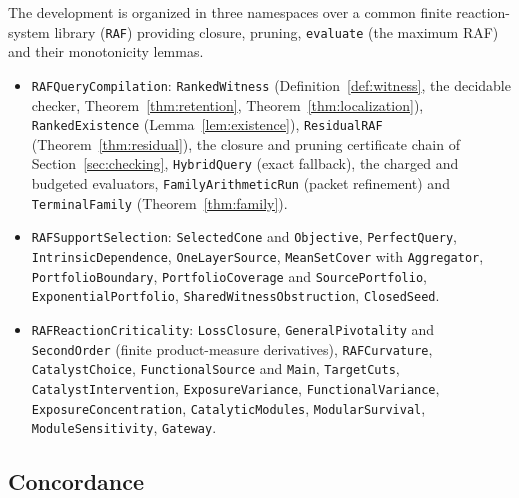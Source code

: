 \documentclass[11pt,a4paper]{article}
\theoremstyle{plain}
\theoremstyle{definition}
\theoremstyle{remark}
\newcommand{\lean}[1]{\texttt{#1}}
\begin{document}
The development is organized in three namespaces over a common finite reaction-system library (\lean{RAF}) providing closure, pruning, \lean{evaluate} (the maximum RAF) and their monotonicity lemmas.
\begin{itemize}[leftmargin=1.5em]\raggedright
\item \lean{RAFQueryCompilation}: \lean{RankedWitness} (Definition~\ref{def:witness}, the decidable checker, Theorem~\ref{thm:retention}, Theorem~\ref{thm:localization}), \lean{RankedExistence} (Lemma~\ref{lem:existence}), \lean{ResidualRAF} (Theorem~\ref{thm:residual}), the closure and pruning certificate chain of Section~\ref{sec:checking}, \lean{HybridQuery} (exact fallback), the charged and budgeted evaluators, \lean{FamilyArithmeticRun} (packet refinement) and \lean{TerminalFamily} (Theorem~\ref{thm:family}).
\item \lean{RAFSupportSelection}: \lean{SelectedCone} and \lean{Objective}, \lean{PerfectQuery}, \lean{IntrinsicDependence}, \lean{OneLayerSource}, \lean{MeanSetCover} with \lean{Aggregator}, \lean{PortfolioBoundary}, \lean{PortfolioCoverage} and \lean{SourcePortfolio}, \lean{ExponentialPortfolio}, \lean{SharedWitnessObstruction}, \lean{ClosedSeed}.
\item \lean{RAFReactionCriticality}: \lean{LossClosure}, \lean{GeneralPivotality} and \lean{SecondOrder} (finite product-measure derivatives), \lean{RAFCurvature}, \lean{CatalystChoice}, \lean{FunctionalSource} and \lean{Main}, \lean{TargetCuts}, \lean{CatalystIntervention}, \lean{ExposureVariance}, \lean{FunctionalVariance}, \lean{ExposureConcentration}, \lean{CatalyticModules}, \lean{ModularSurvival}, \lean{ModuleSensitivity}, \lean{Gateway}.
\end{itemize}

\subsection{Concordance}
\end{document}
